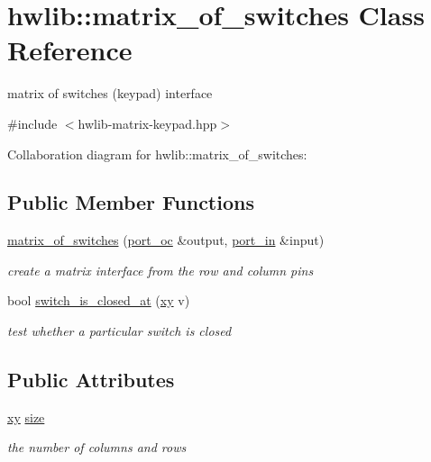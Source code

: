 \hypertarget{classhwlib_1_1matrix__of__switches}{}\section{hwlib\+:\+:matrix\+\_\+of\+\_\+switches Class Reference}
\label{classhwlib_1_1matrix__of__switches}


matrix of switches (keypad) interface  




{\ttfamily \#include $<$hwlib-\/matrix-\/keypad.\+hpp$>$}



Collaboration diagram for hwlib\+:\+:matrix\+\_\+of\+\_\+switches\+:
\subsection*{Public Member Functions}
\begin{DoxyCompactItemize}
\item 
\hyperlink{classhwlib_1_1matrix__of__switches_a7b6df331ad1f31001ec0ab3ac51ecbc9}{matrix\+\_\+of\+\_\+switches} (\hyperlink{classhwlib_1_1port__oc}{port\+\_\+oc} \&output, \hyperlink{classhwlib_1_1port__in}{port\+\_\+in} \&input)
\begin{DoxyCompactList}\small\item\em create a matrix interface from the row and column pins \end{DoxyCompactList}\item 
bool \hyperlink{classhwlib_1_1matrix__of__switches_a7af15bdf772a3c90818e79b6b69c85c0}{switch\+\_\+is\+\_\+closed\+\_\+at} (\hyperlink{classhwlib_1_1xy}{xy} v)
\begin{DoxyCompactList}\small\item\em test whether a particular switch is closed \end{DoxyCompactList}\end{DoxyCompactItemize}
\subsection*{Public Attributes}
\begin{DoxyCompactItemize}
\item 
\mbox{\label{classhwlib_1_1matrix__of__switches_af9338e1f86b6d89cedd21ec38d0559a0}} 
\hyperlink{classhwlib_1_1xy}{xy} \hyperlink{classhwlib_1_1matrix__of__switches_af9338e1f86b6d89cedd21ec38d0559a0}{size}
\begin{DoxyCompactList}\small\item\em the number of columns and rows \end{DoxyCompactList}\end{DoxyCompactItemize}


